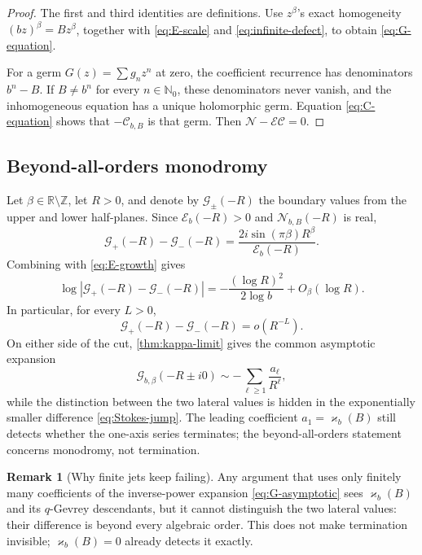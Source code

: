 \documentclass[11pt]{article}
\theoremstyle{definition}
\newtheorem{remark}[theorem]{Remark}
\newcommand{\Nker}{\mathscr{N}}
\newcommand{\Eker}{\mathscr{E}}
\newcommand{\Cker}{\mathscr{C}}
\newcommand{\Gker}{\mathscr{G}}
\newcommand{\kk}{\varkappa}
\newcommand{\N}{\mathbb{N}}
\newcommand{\Z}{\mathbb{Z}}
\newcommand{\R}{\mathbb{R}}
\begin{document}
\begin{proof}
The first and third identities are definitions.  Use $z^\beta$'s exact homogeneity $(bz)^\beta=Bz^\beta$, together with \eqref{eq:E-scale} and \eqref{eq:infinite-defect}, to obtain \eqref{eq:G-equation}.

For a germ $G(z)=\sum g_nz^n$ at zero, the coefficient recurrence has denominators $b^n-B$.  If $B\ne b^n$ for every $n\in\N_0$, these denominators never vanish, and the inhomogeneous equation has a unique holomorphic germ.  Equation \eqref{eq:C-equation} shows that $-\Cker_{b,B}$ is that germ.  Then $\Nker-\Eker\Cker=0$.
\end{proof}

\subsection{Beyond-all-orders monodromy}

Let $\beta\in\R\setminus\Z$, let $R>0$, and denote by $\Gker_\pm(-R)$ the boundary values from the upper and lower half-planes.  Since $\Eker_b(-R)>0$ and $\Nker_{b,B}(-R)$ is real,
\begin{equation}\label{eq:Stokes-jump}
 \Gker_+(-R)-\Gker_-(-R)
 =\frac{2i\sin(\pi\beta)R^\beta}{\Eker_b(-R)}.
\end{equation}
Combining with \eqref{eq:E-growth} gives
\begin{equation}\label{eq:jump-growth}
 \log|\Gker_+(-R)-\Gker_-(-R)|
 =-\frac{(\log R)^2}{2\log b}+O_\beta(\log R).
\end{equation}
In particular, for every $L>0$,
\begin{equation}\label{eq:beyond-all-orders}
 \Gker_+(-R)-\Gker_-(-R)=o(R^{-L}).
\end{equation}
On either side of the cut, \cref{thm:kappa-limit} gives the common asymptotic expansion
\begin{equation}\label{eq:G-asymptotic}
 \Gker_{b,\beta}(-R\pm i0)
 \sim-\sum_{\ell\ge1}\frac{a_\ell}{R^\ell},
\end{equation}
while the distinction between the two lateral values is hidden in the exponentially smaller difference \eqref{eq:Stokes-jump}.  The leading coefficient $a_1=\kk_b(B)$ still detects whether the one-axis series terminates; the beyond-all-orders statement concerns monodromy, not termination.

\begin{remark}[Why finite jets keep failing]
Any argument that uses only finitely many coefficients of the inverse-power expansion
\eqref{eq:G-asymptotic} sees $\kk_b(B)$ and its $q$-Gevrey descendants, but it cannot
distinguish the two lateral values: their difference is beyond every algebraic order.  This
does not make termination invisible; $\kk_b(B)=0$ already detects it exactly.
\end{remark}
\end{document}
